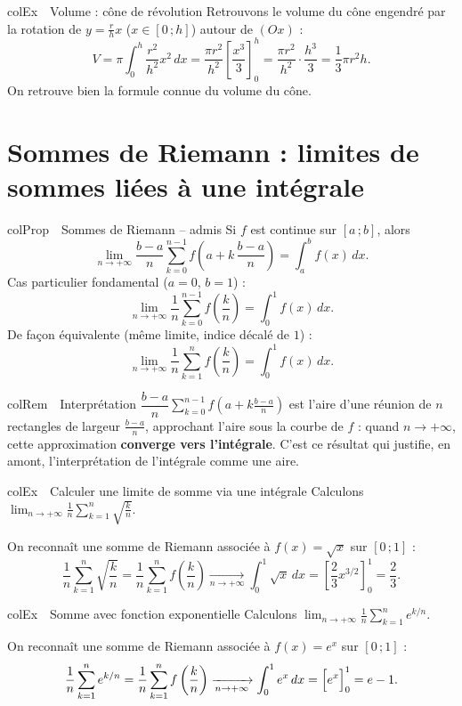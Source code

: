 \documentclass[11pt,a4paper]{article}
\newenvironment{propriete}[1][Propriété]
  {\begin{fiche}{colProp}{\ding{72}~~#1}}{\end{fiche}}
\newenvironment{exemple}[1][Exemple]
  {\begin{fiche}{colEx}{\ding{217}~~#1}}{\end{fiche}}
\newenvironment{remarque}[1][Remarque]
  {\begin{fiche}{colRem}{\ding{43}~~#1}}{\end{fiche}}
\begin{document}
\begin{exemple}[Volume : cône de révolution]
Retrouvons le volume du cône engendré par la rotation de $y=\frac rhx$ ($x\in[0\,;h]$) autour de $(Ox)$ :
\[
  V = \pi\int_0^h\frac{r^2}{h^2}x^2\,dx = \frac{\pi r^2}{h^2}\left[\frac{x^3}3\right]_0^h = \frac{\pi r^2}{h^2}\cdot\frac{h^3}3 = \frac13\pi r^2h.
\]
On retrouve bien la formule connue du volume du cône.
\end{exemple}

\section{Sommes de Riemann : limites de sommes liées à une intégrale}

\begin{propriete}[Sommes de Riemann -- admis]
Si $f$ est continue sur $[a\,;b]$, alors
\[
  \lim_{n\to+\infty}\frac{b-a}{n}\sum_{k=0}^{n-1}f\left(a+k\,\frac{b-a}{n}\right) = \int_a^bf(x)\,dx.
\]
Cas particulier fondamental ($a=0$, $b=1$) :
\[
  \lim_{n\to+\infty}\frac1n\sum_{k=0}^{n-1}f\left(\frac kn\right) = \int_0^1f(x)\,dx.
\]
De façon équivalente (même limite, indice décalé de $1$) :
\[
  \lim_{n\to+\infty}\frac1n\sum_{k=1}^{n}f\left(\frac kn\right) = \int_0^1f(x)\,dx.
\]
\end{propriete}

\begin{remarque}[Interprétation]
$\dfrac{b-a}{n}\displaystyle\sum_{k=0}^{n-1}f\left(a+k\frac{b-a}{n}\right)$ est l'aire d'une réunion de $n$ rectangles de largeur $\frac{b-a}{n}$, approchant l'aire sous la courbe de $f$ : quand $n\to+\infty$, cette approximation \textbf{converge vers l'intégrale}. C'est ce résultat qui justifie, en amont, l'interprétation de l'intégrale comme une aire.
\end{remarque}

\begin{exemple}[Calculer une limite de somme via une intégrale]
Calculons $\displaystyle\lim_{n\to+\infty}\frac1n\sum_{k=1}^{n}\sqrt{\frac kn}$.

\smallskip
On reconnaît une somme de Riemann associée à $f(x)=\sqrt x$ sur $[0\,;1]$ :
\[
  \frac1n\sum_{k=1}^n\sqrt{\frac kn} = \frac1n\sum_{k=1}^nf\left(\frac kn\right) \xrightarrow[n\to+\infty]{} \int_0^1\sqrt x\,dx = \left[\frac23x^{3/2}\right]_0^1 = \frac23.
\]
\end{exemple}

\begin{exemple}[Somme avec fonction exponentielle]
Calculons $\displaystyle\lim_{n\to+\infty}\frac1n\sum_{k=1}^{n}e^{k/n}$.

\smallskip
On reconnaît une somme de Riemann associée à $f(x)=e^x$ sur $[0\,;1]$ :
\[
  \frac1n\sum_{k=1}^ne^{k/n} = \frac1n\sum_{k=1}^nf\left(\frac kn\right) \xrightarrow[n\to+\infty]{} \int_0^1e^x\,dx = \Bigl[e^x\Bigr]_0^1 = e-1.
\]
\end{exemple}
\end{document}
